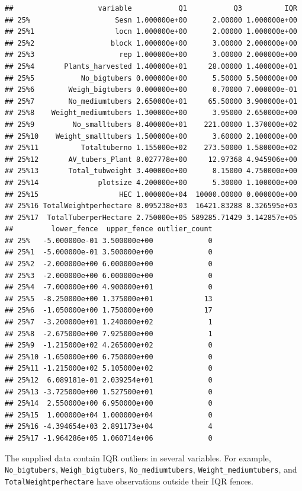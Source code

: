 \documentclass[
]{article}
\begin{document}
\begin{verbatim}
##                    variable           Q1           Q3          IQR
## 25%                    Sesn 1.000000e+00      2.00000 1.000000e+00
## 25%1                   locn 1.000000e+00      2.00000 1.000000e+00
## 25%2                  block 1.000000e+00      3.00000 2.000000e+00
## 25%3                    rep 1.000000e+00      3.00000 2.000000e+00
## 25%4       Plants_harvested 1.400000e+01     28.00000 1.400000e+01
## 25%5           No_bigtubers 0.000000e+00      5.50000 5.500000e+00
## 25%6        Weigh_bigtubers 0.000000e+00      0.70000 7.000000e-01
## 25%7        No_mediumtubers 2.650000e+01     65.50000 3.900000e+01
## 25%8    Weight_mediumtubers 1.300000e+00      3.95000 2.650000e+00
## 25%9         No_smalltubers 8.400000e+01    221.00000 1.370000e+02
## 25%10    Weight_smalltubers 1.500000e+00      3.60000 2.100000e+00
## 25%11          Totaltuberno 1.155000e+02    273.50000 1.580000e+02
## 25%12       AV_tubers_Plant 8.027778e+00     12.97368 4.945906e+00
## 25%13       Total_tubweight 3.400000e+00      8.15000 4.750000e+00
## 25%14              plotsize 4.200000e+00      5.30000 1.100000e+00
## 25%15                   HEC 1.000000e+04  10000.00000 0.000000e+00
## 25%16 TotalWeightperhectare 8.095238e+03  16421.83288 8.326595e+03
## 25%17  TotalTuberperHectare 2.750000e+05 589285.71429 3.142857e+05
##         lower_fence  upper_fence outlier_count
## 25%   -5.000000e-01 3.500000e+00             0
## 25%1  -5.000000e-01 3.500000e+00             0
## 25%2  -2.000000e+00 6.000000e+00             0
## 25%3  -2.000000e+00 6.000000e+00             0
## 25%4  -7.000000e+00 4.900000e+01             0
## 25%5  -8.250000e+00 1.375000e+01            13
## 25%6  -1.050000e+00 1.750000e+00            17
## 25%7  -3.200000e+01 1.240000e+02             1
## 25%8  -2.675000e+00 7.925000e+00             1
## 25%9  -1.215000e+02 4.265000e+02             0
## 25%10 -1.650000e+00 6.750000e+00             0
## 25%11 -1.215000e+02 5.105000e+02             0
## 25%12  6.089181e-01 2.039254e+01             0
## 25%13 -3.725000e+00 1.527500e+01             0
## 25%14  2.550000e+00 6.950000e+00             0
## 25%15  1.000000e+04 1.000000e+04             0
## 25%16 -4.394654e+03 2.891173e+04             4
## 25%17 -1.964286e+05 1.060714e+06             0
\end{verbatim}

The supplied data contain IQR outliers in several variables. For
example, \texttt{No\_bigtubers}, \texttt{Weigh\_bigtubers},
\texttt{No\_mediumtubers}, \texttt{Weight\_mediumtubers}, and
\texttt{TotalWeightperhectare} have observations outside their IQR
fences.
\end{document}
